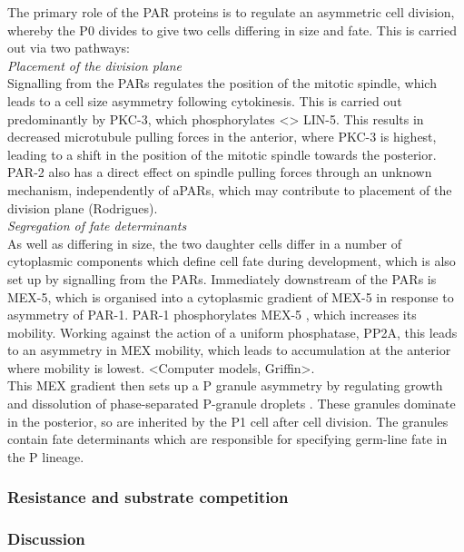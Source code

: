 \documentclass[12pt]{"article"}
\begin{document}
The primary role of the PAR proteins is to regulate an asymmetric cell division, whereby the P0 divides to give two cells differing in size and fate. This is carried out via two pathways:\\

\textit{Placement of the division plane}\\

Signalling from the PARs regulates the position of the mitotic spindle, which leads to a cell size asymmetry following cytokinesis. This is carried out predominantly by PKC-3, which phosphorylates <> LIN-5. This results in decreased microtubule pulling forces in the anterior, where PKC-3 is highest, leading to a shift in the position of the mitotic spindle towards the posterior. PAR-2 also has a direct effect on spindle pulling forces through an unknown mechanism, independently of aPARs, which may contribute to placement of the division plane (Rodrigues).\\


\textit{Segregation of fate determinants}\\

As well as differing in size, the two daughter cells differ in a number of cytoplasmic components which define cell fate during development, which is also set up by signalling from the PARs. Immediately downstream of the PARs is MEX-5, which is organised into a cytoplasmic gradient of MEX-5 in response to asymmetry of PAR-1. PAR-1 phosphorylates MEX-5 \citep{Griffin2011}, which increases its mobility. Working against the action of a uniform phosphatase, PP2A, this leads to an asymmetry in MEX mobility, which leads to accumulation at the anterior where mobility is lowest. <Computer models, Griffin>. \\

This MEX gradient then sets up a P granule asymmetry by regulating growth and dissolution of phase-separated P-granule droplets \citep{Brangwynne2009}. These granules dominate in the posterior, so are inherited by the P1 cell after cell division. The granules contain fate determinants which are responsible for specifying germ-line fate in the P lineage.\\


\subsubsection{Resistance and substrate competition}

\subsubsection{Discussion}
\end{document}
